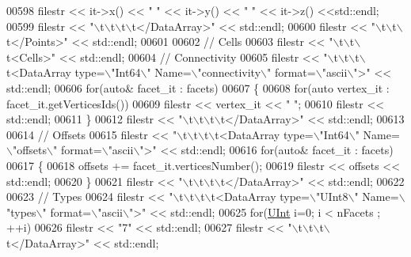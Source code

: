 \begin{DoxyCode}
00598         filestr << it->x() << \textcolor{stringliteral}{" "} << it->y() << \textcolor{stringliteral}{" "} << it->z() <<std::endl;
00599     filestr << \textcolor{stringliteral}{"\(\backslash\)t\(\backslash\)t\(\backslash\)t\(\backslash\)t</DataArray>"} << std::endl;
00600     filestr << \textcolor{stringliteral}{"\(\backslash\)t\(\backslash\)t\(\backslash\)t</Points>"} << std::endl;
00601 
00602     \textcolor{comment}{// Cells}
00603     filestr << \textcolor{stringliteral}{"\(\backslash\)t\(\backslash\)t\(\backslash\)t<Cells>"} << std::endl;
00604     \textcolor{comment}{//  Connectivity}
00605     filestr << \textcolor{stringliteral}{"\(\backslash\)t\(\backslash\)t\(\backslash\)t\(\backslash\)t<DataArray type=\(\backslash\)"Int64\(\backslash\)" Name=\(\backslash\)"connectivity\(\backslash\)" format=\(\backslash\)"ascii\(\backslash\)">"} << std::endl;
00606     \textcolor{keywordflow}{for}(\textcolor{keyword}{auto}& facet\_it : facets)
00607     \{
00608         \textcolor{keywordflow}{for}(\textcolor{keyword}{auto} vertex\_it : facet\_it.getVerticesIds())
00609             filestr << vertex\_it << \textcolor{stringliteral}{" "};
00610         filestr << std::endl;
00611     \}
00612     filestr << \textcolor{stringliteral}{"\(\backslash\)t\(\backslash\)t\(\backslash\)t\(\backslash\)t</DataArray>"} << std::endl;
00613 
00614     \textcolor{comment}{//  Offsets}
00615     filestr << \textcolor{stringliteral}{"\(\backslash\)t\(\backslash\)t\(\backslash\)t\(\backslash\)t<DataArray type=\(\backslash\)"Int64\(\backslash\)" Name=\(\backslash\)"offsets\(\backslash\)" format=\(\backslash\)"ascii\(\backslash\)">"} << std::endl;
00616     \textcolor{keywordflow}{for}(\textcolor{keyword}{auto}& facet\_it : facets)
00617     \{
00618         offsets += facet\_it.verticesNumber();
00619         filestr << offsets << std::endl;
00620     \}
00621     filestr << \textcolor{stringliteral}{"\(\backslash\)t\(\backslash\)t\(\backslash\)t\(\backslash\)t</DataArray>"} << std::endl;
00622 
00623     \textcolor{comment}{//  Types}
00624     filestr << \textcolor{stringliteral}{"\(\backslash\)t\(\backslash\)t\(\backslash\)t\(\backslash\)t<DataArray type=\(\backslash\)"UInt8\(\backslash\)" Name=\(\backslash\)"types\(\backslash\)" format=\(\backslash\)"ascii\(\backslash\)">"} << std::endl;
00625     \textcolor{keywordflow}{for}(\hyperlink{namespaceFVCode3D_a4bf7e328c75d0fd504050d040ebe9eda}{UInt} i=0; i < nFacets ; ++i)
00626         filestr << \textcolor{stringliteral}{"7"} << std::endl;
00627     filestr << \textcolor{stringliteral}{"\(\backslash\)t\(\backslash\)t\(\backslash\)t\(\backslash\)t</DataArray>"} << std::endl;

\end{DoxyCode}

